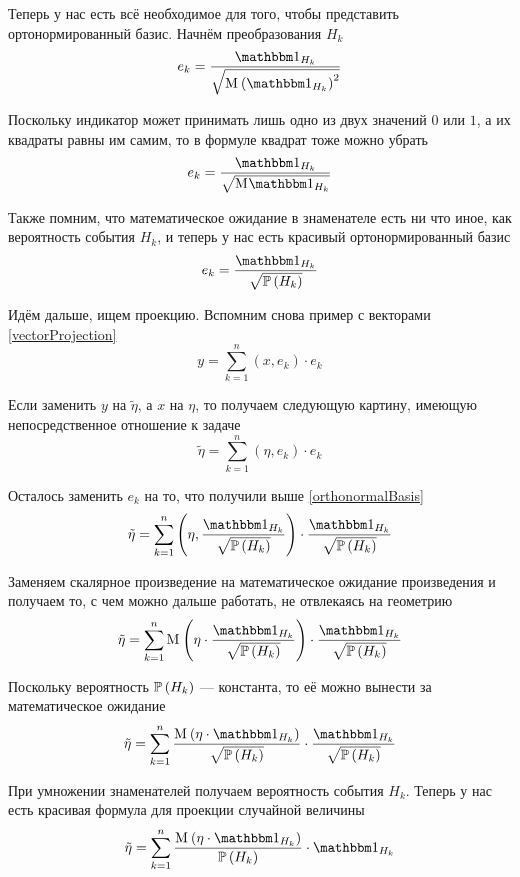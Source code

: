Теперь у нас есть всё необходимое для того,
чтобы представить ортонормированный базис.
Начнём преобразования $H_k$
$$e_k = \frac{\indicatorof{H_k}}
    {\sqrt{\mean{\left( \indicatorof{H_k} \right)^2}}}$$

Поскольку индикатор может принимать лишь одно из двух значений $0$ или $1$,
а их квадраты равны им самим, то в формуле квадрат тоже можно убрать
$$e_k = \frac{\indicatorof{H_k}}{\sqrt{\mean{\indicatorof{H_k}}}}$$

Также помним, что математическое ожидание в знаменателе есть ни что иное,
как вероятность события $H_k$,
и теперь у нас есть красивый ортонормированный базис
\begin{equation}\label{orthonormalBasis}
e_k = \frac{\indicatorof{H_k}}{\sqrt{\probability{H_k}}}
\end{equation}

Идём дальше, ищем проекцию.
Вспомним снова пример с векторами \eqref{vectorProjection}
$$y = \sum_{k=1}^n \left( x, e_k \right) \cdot e_k$$

Если заменить $y$ на $\tilde{\eta}$, а $x$ на $\eta$,
то получаем следующую картину, имеющую непосредственное отношение к задаче
$$\tilde{\eta} = \sum_{k=1}^n \left( \eta, e_k \right) \cdot e_k$$

Осталось заменить $e_k$ на то, что получили выше \eqref{orthonormalBasis}
$$\tilde{\eta}
    = \sum_{k=1}^n
        \left( \eta, \frac{\indicatorof{H_k}}{\sqrt{\probability{H_k}}} \right) 
        \cdot \frac{\indicatorof{H_k}}{\sqrt{\probability{H_k}}}$$

Заменяем скалярное произведение на математическое ожидание произведения
и получаем то, с чем можно дальше работать, не отвлекаясь на геометрию
$$\tilde{\eta}
    = \sum_{k=1}^n
        \mean{\left( \eta
            \cdot \frac{\indicatorof{H_k}}{\sqrt{\probability{H_k}}} \right)}
        \cdot \frac{\indicatorof{H_k}}{\sqrt{\probability{H_k}}}$$

Поскольку вероятность $\mathbb{P}\left( H_k \right)$ --- константа,
то её можно вынести за математическое ожидание
$$\tilde{\eta}
    = \sum_{k=1}^n
        \frac{\mean{\left( \eta \cdot \indicatorof{H_k} \right)}}
            {\sqrt{\probability{H_k}}}
        \cdot \frac{\indicatorof{H_k}}{\sqrt{\probability{H_k}}}$$

При умножении знаменателей получаем вероятность события $H_k$.
Теперь у нас есть красивая формула для проекции случайной величины
\begin{equation}\label{discreteConditionalExpectation}
    \tilde{\eta} = \sum_{k=1}^n
        \frac{\mean{\left( \eta \cdot \indicatorof{H_k} \right)}}
            {\probability{H_k}}
        \cdot \indicatorof{H_k}
\end{equation}

